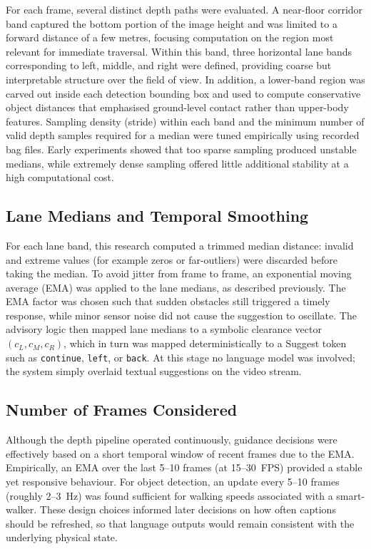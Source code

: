 \documentclass[11pt,a4paper]{article}
\newcommand{\code}[1]{\texttt{#1}}
\begin{document}
For each frame, several distinct depth paths were evaluated. A near-floor corridor band captured the bottom portion of the image height and was limited to a forward distance of a few metres, focusing computation on the region most relevant for immediate traversal. Within this band, three horizontal lane bands corresponding to left, middle, and right were defined, providing coarse but interpretable structure over the field of view. In addition, a lower-band region was carved out inside each detection bounding box and used to compute conservative object distances that emphasised ground-level contact rather than upper-body features. Sampling density (stride) within each band and the minimum number of valid depth samples required for a median were tuned empirically using recorded bag files. Early experiments showed that too sparse sampling produced unstable medians, while extremely dense sampling offered little additional stability at a high computational cost.

\subsection{Lane Medians and Temporal Smoothing}

For each lane band, this research computed a trimmed median distance: invalid and extreme values (for example zeros or far-outliers) were discarded before taking the median. To avoid jitter from frame to frame, an exponential moving average (EMA) was applied to the lane medians, as described previously. The EMA factor was chosen such that sudden obstacles still triggered a timely response, while minor sensor noise did not cause the suggestion to oscillate. The advisory logic then mapped lane medians to a symbolic clearance vector $(c_L, c_M, c_R)$, which in turn was mapped deterministically to a Suggest token such as \code{continue}, \code{left}, or \code{back}. At this stage no language model was involved; the system simply overlaid textual suggestions on the video stream.

\subsection{Number of Frames Considered}

Although the depth pipeline operated continuously, guidance decisions were effectively based on a short temporal window of recent frames due to the EMA. Empirically, an EMA over the last 5--10 frames (at 15--30~FPS) provided a stable yet responsive behaviour. For object detection, an update every 5--10 frames (roughly 2--3~Hz) was found sufficient for walking speeds associated with a smart-walker. These design choices informed later decisions on how often captions should be refreshed, so that language outputs would remain consistent with the underlying physical state.
\end{document}
